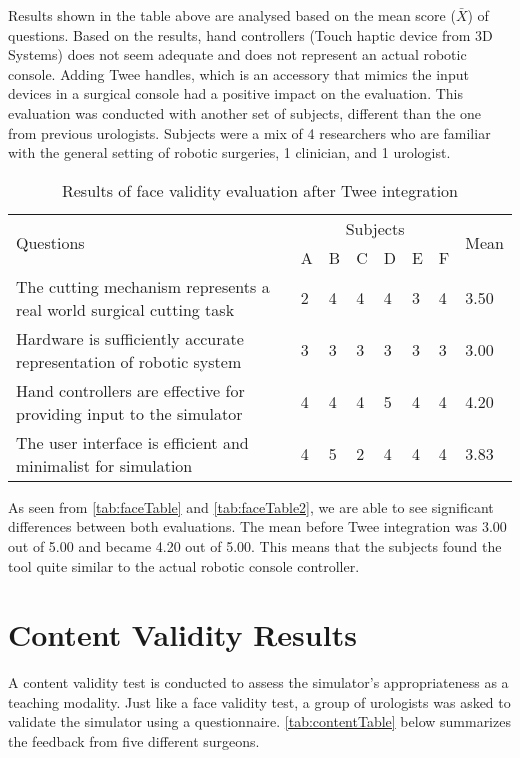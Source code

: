 Results shown in the table above are analysed based on the mean score ($\bar{X}$) of questions. Based on the results, hand controllers (Touch haptic device from 3D Systems) does not seem adequate and does not represent an actual robotic console. Adding Twee handles, which is an accessory that mimics the input devices in a surgical console had a positive impact on the evaluation. This evaluation was conducted with another set of subjects, different than the one from previous urologists. Subjects were a mix of 4 researchers who are familiar with the general setting of robotic surgeries, 1 clinician, and 1 urologist.


\begin{table}
\small
\centering
\begin{tabular}{p{6cm}p{0.5cm}p{0.5cm}p{0.5cm}p{0.5cm}p{0.5cm}p{0.5cm}p{0.8cm}}
  \multirow{2}{4em}{Questions} & \multicolumn{6}{c}{Subjects} & \multirow{2}{4em}{Mean}\\
  \cmidrule{2-7}
  & A & B & C & D & E & F &\\
  \toprule
  The cutting mechanism represents a real world surgical cutting task & 2& 4& 4& 4 & 3& 4 & 3.50\\
  \midrule
  Hardware is sufficiently accurate representation of robotic system
  & 3& 3& 3 & 3 & 3 & 3 & 3.00\\
  \midrule
  Hand controllers are effective for providing input to the simulator
  & 4 & 4 & 4& 5& 4 & 4 & 4.20\\
  \midrule
  The user interface is efficient and minimalist for simulation  & 4 & 5& 2 & 4 & 4& 4 & 3.83\\
  \bottomrule
\end{tabular}
\caption{Results of face validity evaluation after Twee integration}
\label{tab:faceTable2}
\end{table}

As seen from \autoref{tab:faceTable} and \autoref{tab:faceTable2}, we are able to see significant differences between both evaluations. The mean before Twee integration was 3.00 out of 5.00 and became 4.20 out of 5.00. This means that the subjects found the tool quite similar to the actual robotic console controller.

\section{Content Validity Results}
\label{sec:content}
A content validity test is conducted to assess the simulator's appropriateness as a teaching modality. Just like a face validity test, a group of urologists was asked to validate the simulator using a questionnaire. \autoref{tab:contentTable} below summarizes the feedback from five different surgeons.

